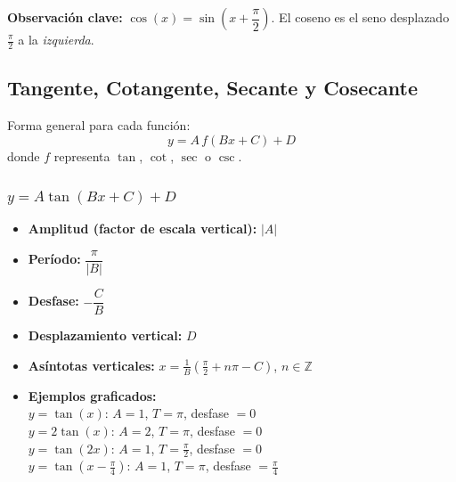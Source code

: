 \documentclass[12pt,a4paper]{article}
\begin{document}
\begin{tcolorbox}[notabox]
\textbf{Observación clave:} $\cos(x) = \sin\!\left(x + \dfrac{\pi}{2}\right)$.
El coseno es el seno desplazado $\tfrac{\pi}{2}$ a la \textit{izquierda}.
\end{tcolorbox}

\subsection{Tangente, Cotangente, Secante y Cosecante}

Forma general para cada función:
\[
  y = A\,f(Bx + C) + D
\]
donde $f$ representa $\tan$, $\cot$, $\sec$ o $\csc$.

\subsubsection*{$y = A\tan(Bx+C)+D$}

\begin{itemize}[leftmargin=*, itemsep=3pt]
  \item \textbf{Amplitud (factor de escala vertical):} $|A|$
  \item \textbf{Período:} $\dfrac{\pi}{|B|}$
  \item \textbf{Desfase:} $-\dfrac{C}{B}$
  \item \textbf{Desplazamiento vertical:} $D$
  \item \textbf{Asíntotas verticales:}
        $\displaystyle x = \frac{1}{B}\!\left(\frac{\pi}{2}+n\pi-C\right)$,\;
        $n\in\mathbb{Z}$
  \item \textbf{Ejemplos graficados:}\\[2pt]
        $y=\tan(x)$: $A=1$, $T=\pi$, desfase $=0$\\
        $y=2\tan(x)$: $A=2$, $T=\pi$, desfase $=0$\\
        $y=\tan(2x)$: $A=1$, $T=\tfrac{\pi}{2}$, desfase $=0$\\
        $y=\tan\!\left(x-\tfrac{\pi}{4}\right)$:
          $A=1$, $T=\pi$, desfase $=\tfrac{\pi}{4}$
\end{itemize}
\end{document}
